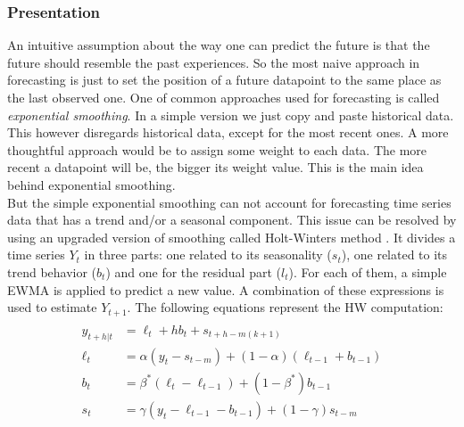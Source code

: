 \subsubsection{Presentation}
An intuitive assumption about the way one can predict the future is that the future should resemble the past experiences. So the most naive approach in forecasting is just to set the position of a future datapoint to the same place as the last observed one. One of common approaches used for forecasting is called \textit{exponential smoothing}. In a simple version we just copy and paste historical data. This however disregards historical data, except for the most recent ones. A more thoughtful approach would be to assign some weight to each data. The more recent a datapoint will be, the bigger its weight value. This is the main idea behind exponential smoothing.\\
But the simple exponential smoothing can not account for forecasting time series data that has a trend and/or a seasonal component. This issue can be resolved by using an upgraded version of smoothing called Holt-Winters method \cite{holt}.
It divides a time series $Y_{t}$ in three parts: one related to its seasonality ($s_{t}$), one related to its  trend behavior ($b_{t}$) and one for  the residual part ($l_{t}$). For each  of them, a simple EWMA is  applied  to predict a new value.  A  combination  of  these  expressions  is  used  to  estimate  $Y_{t+1}$. The following equations represent the HW computation: \\
\begin{align*}\\
  \hat{y}_{t+h|t} &= \ell_{t} + hb_{t} + s_{t+h-m(k+1)} \\
  \ell_{t} &= \alpha(y_{t} - s_{t-m}) + (1 - \alpha)(\ell_{t-1} + b_{t-1})\\
  b_{t} &= \beta^*(\ell_{t} - \ell_{t-1}) + (1 - \beta^*)b_{t-1}\\
  s_{t} &= \gamma (y_{t}-\ell_{t-1}-b_{t-1}) + (1-\gamma)s_{t-m}
\end{align*}
